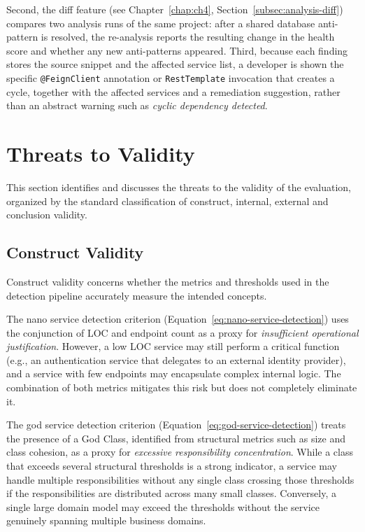 \par Second, the diff feature (see Chapter~\ref{chap:ch4}, Section~\ref{subsec:analysis-diff}) compares two analysis runs of the same project: after a shared database anti-pattern is resolved, the re-analysis reports the resulting change in the health score and whether any new anti-patterns appeared. Third, because each finding stores the source snippet and the affected service list, a developer is shown the specific \texttt{@FeignClient} annotation or \texttt{RestTemplate} invocation that creates a cycle, together with the affected services and a remediation suggestion, rather than an abstract warning such as \textit{cyclic dependency detected}.

\section{Threats to Validity}
\label{sec:threats-validity}

\par This section identifies and discusses the threats to the validity of the evaluation, organized by the standard classification of construct, internal, external and conclusion validity.

\subsection{Construct Validity}
\label{subsec:construct-validity}

\par Construct validity concerns whether the metrics and thresholds used in the detection pipeline accurately measure the intended concepts.

\par The nano service detection criterion (Equation~\ref{eq:nano-service-detection}) uses the conjunction of LOC and endpoint count as a proxy for \textit{insufficient operational justification}. However, a low LOC service may still perform a critical function (e.g., an authentication service that delegates to an external identity provider), and a service with few endpoints may encapsulate complex internal logic. The combination of both metrics mitigates this risk but does not completely eliminate it.

\par The god service detection criterion (Equation~\ref{eq:god-service-detection}) treats the presence of a God Class, identified from structural metrics such as size and class cohesion, as a proxy for \textit{excessive responsibility concentration}. While a class that exceeds several structural thresholds is a strong indicator, a service may handle multiple responsibilities without any single class crossing those thresholds if the responsibilities are distributed across many small classes. Conversely, a single large domain model may exceed the thresholds without the service genuinely spanning multiple business domains.

